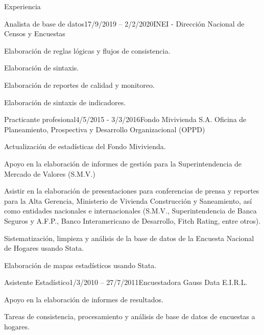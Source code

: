 \documentclass[
11pt, %
]{resume} %
\begin{document}
\begin{rSection}{Experiencia}
			
			\begin{rSubsection}{Analista de base de datos}{17/9/2019 – 2/2/2020}{INEI - Dirección Nacional de Censos y Encuestas}{}
				\item Elaboración de reglas lógicas y flujos de consistencia.
				\item Elaboración de sintaxis.
				\item Elaboración de reportes de calidad y monitoreo.
				\item Elaboración de sintaxis de indicadores.
			\end{rSubsection}
			
			
			\begin{rSubsection}{Practicante profesional}{4/5/2015 - 3/3/2016}{Fondo Mivivienda S.A. Oficina de Planeamiento, Prospectiva y Desarrollo Organizacional (OPPD)}{}
				\item	Actualización de estadísticas del Fondo Mivivienda.
				\item	Apoyo en la elaboración de informes de gestión para la Superintendencia de Mercado de Valores (S.M.V.)
				\item	Asistir en la elaboración de presentaciones para conferencias de prensa y reportes para la Alta Gerencia, Ministerio de Vivienda Construcción y Saneamiento, así como entidades nacionales e internacionales (S.M.V., Superintendencia de Banca Seguros y A.F.P., Banco Interamericano de Desarrollo, Fitch Rating, entre otros).
				\item	Sistematización, limpieza y análisis de la base de datos de la Encuesta Nacional de Hogares usando Stata. 
				\item	Elaboración de mapas estadísticos usando Stata.
			\end{rSubsection}
			
			
			\begin{rSubsection}{Asistente Estadístico}{1/3/2010 – 27/7/2011}{Encuestadora Gauss Data E.I.R.L.}{}
				\item	Apoyo en la elaboración de informes de resultados.
				\item	Tareas de consistencia, procesamiento y análisis de base de datos de encuestas a hogares.
			\end{rSubsection}
			
		\end{rSection}
		
\end{document}

